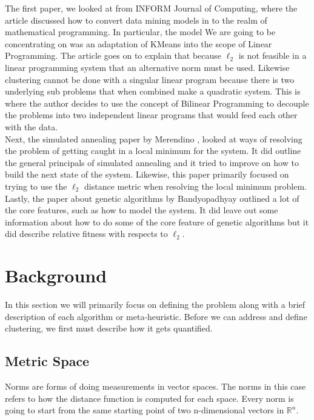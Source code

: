 \documentclass[a4paper,12pt]{article}
\numberwithin{equation}{section}
\begin{document}
The first paper, we looked at from INFORM Journal of Computing, where the article discussed how to convert data mining models in to the realm of mathematical programming\cite{bradley_fayyad_mangasarian_1999}. In particular, the model We are going to be concentrating on was an adaptation of KMeans into the scope of Linear Programming. The article goes on to explain that because $\ell_2$ is not feasible in a linear programming system that an alternative norm must be used. Likewise clustering cannot be done with a singular linear program because there is two underlying sub problems that when combined make a quadratic system.  This is where the author decides to use the concept of Bilinear Programming to decouple the problems into two independent linear programs that would feed each other with the data. \\

Next, the simulated annealing paper by Merendino \cite{Merendino}, looked at ways of resolving the problem of getting caught in a local minimum for the system. It did outline the general principals of simulated annealing and it tried to improve on how to build the next state of the system.  Likewise, this paper primarily focused on trying to use the $\ell_2$ distance metric when resolving the local minimum problem.  \\

Lastly, the paper about genetic algorithms by Bandyopadhyay \cite{bandyopadhyay_maulik_2002} outlined a lot of the core features, such as how to model the system. It did leave out some information about how to do some of the core feature of genetic algorithms but it did describe relative fitness with respects to $\ell_2$. 

\section{Background}
 In this section we will primarily focus on defining the problem along with a brief description of each algorithm or meta-heuristic. Before we can address and define clustering, we first must describe how it gets quantified. 
\subsection{Metric Space}
Norms are forms of doing measurements in vector spaces. The norms in this case refers to how the distance function is computed for each space. Every norm is going to start from the same starting point of two n-dimensional vectors in $\mathbb{R}^n$.\\
\end{document}
